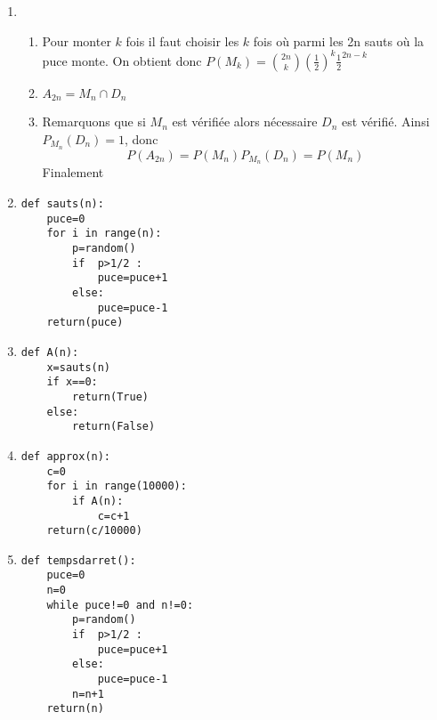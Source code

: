 \documentclass[a4paper, 11pt,reqno]{article}
\begin{document}
\begin{correction}
\begin{enumerate}
\item \begin{enumerate}
\item Pour monter $k$ fois il faut choisir les $k$ fois où  parmi les 2n sauts où la puce monte. On obtient donc  $P(M_k)  =\binom{2n}{k} (\frac{1}{2})^k \frac{1}{2}^{2n-k}$

\item $A_{2n} = M_n \cap D_n$ 
\item Remarquons que si $M_n$ est vérifiée alors nécessaire $D_n$ est vérifié. Ainsi 
$P_{M_n} (D_n) = 1$, donc 
$$P(A_{2n} )  = P(M_n) P_{M_n}(D_n)= P(M_n)$$
Finalement 
\end{enumerate}

\item 

\begin{lstlisting}
def sauts(n):
    puce=0
    for i in range(n):
        p=random()
        if  p>1/2 :
            puce=puce+1
        else:
            puce=puce-1
    return(puce)
\end{lstlisting}
\item 

\begin{lstlisting}
def A(n):
    x=sauts(n)
    if x==0:
    	return(True)
    else:
    	return(False)
\end{lstlisting}

\item 
\begin{lstlisting}
def approx(n):
	c=0
	for i in range(10000):
		if A(n):
			c=c+1
	return(c/10000)
\end{lstlisting}

\item 
\begin{lstlisting}
def tempsdarret():
	puce=0
	n=0
	while puce!=0 and n!=0:
		p=random()
		if  p>1/2 :
			puce=puce+1
		else:
			puce=puce-1
		n=n+1
	return(n)
\end{lstlisting}
\end{enumerate}




\end{correction}
\end{document}
